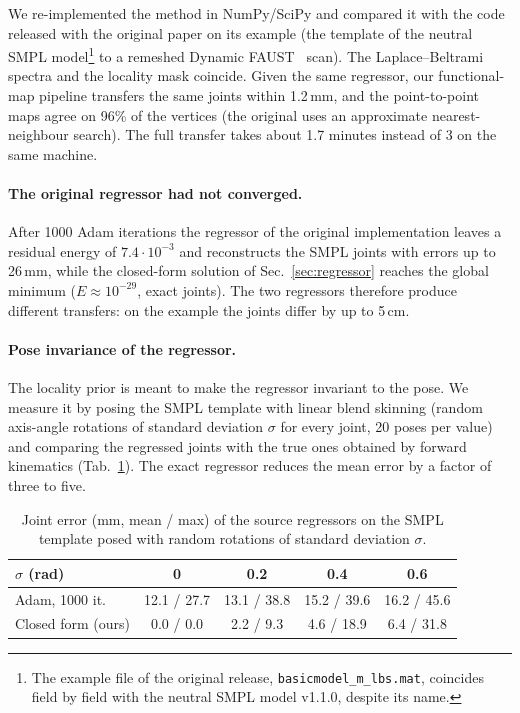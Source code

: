 \documentclass[11pt]{article}
\begin{document}
We re-implemented the method in NumPy/SciPy and compared it with the code
released with the original paper on its example (the template of the neutral
SMPL model\footnote{The example file of the original release,
\texttt{basicmodel\_m\_lbs.mat}, coincides field by field with the neutral
SMPL model v1.1.0, despite its name.} to a remeshed
Dynamic FAUST~\citep{bogo2017dfaust} scan). The Laplace--Beltrami spectra and
the locality mask coincide. Given the same regressor, our functional-map
pipeline transfers the same joints within 1.2\,mm, and the point-to-point maps
agree on 96\% of the vertices (the original uses an approximate
nearest-neighbour search). The full transfer takes about 1.7 minutes instead
of 3 on the same machine.

\paragraph{The original regressor had not converged.} After 1000 Adam
iterations the regressor of the original implementation leaves a residual
energy of $7.4\cdot10^{-3}$ and reconstructs the SMPL joints with errors up to
26\,mm, while the closed-form solution of Sec.~\ref{sec:regressor} reaches the
global minimum ($E \approx 10^{-29}$, exact joints). The two regressors
therefore produce different transfers: on the example the joints differ by up
to 5\,cm.

\paragraph{Pose invariance of the regressor.} The locality prior is meant to
make the regressor invariant to the pose. We measure it by posing the SMPL
template with linear blend skinning (random axis-angle rotations of standard
deviation $\sigma$ for every joint, 20 poses per value) and comparing the
regressed joints with the true ones obtained by forward kinematics
(Tab.~\ref{tab:pose_invariance}). The exact regressor reduces the mean error by
a factor of three to five.

\begin{table}[t]
  \centering
  \caption{Joint error (mm, mean / max) of the source regressors on the SMPL
  template posed with random rotations of standard deviation $\sigma$.}
  \label{tab:pose_invariance}
  \begin{tabular}{lcccc}
    \toprule
    $\sigma$ (rad) & 0 & 0.2 & 0.4 & 0.6 \\
    \midrule
    Adam, 1000 it.~\citep{musoni2021functional} & 12.1 / 27.7 & 13.1 / 38.8 & 15.2 / 39.6 & 16.2 / 45.6 \\
    Closed form (ours)                           & 0.0 / 0.0   & 2.2 / 9.3   & 4.6 / 18.9  & 6.4 / 31.8 \\
    \bottomrule
  \end{tabular}
\end{table}
\end{document}

